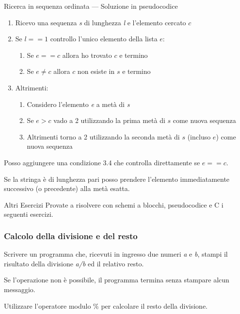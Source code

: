 \documentclass[aspectratio=169]{beamer}
\begin{document}
\begin{frame}[allowframebreaks]{Ricerca in sequenza ordinata --- Soluzione in pseudocodice}
\begin{enumerate}
	\item Ricevo una sequenza \emph{s} di lunghezza \emph{l} e l'elemento cercato $c$
	\item Se $l == 1$ controllo l'unico elemento della lista $e$:
	\begin{enumerate}
		\item Se $e==c$ allora ho trovato $c$ e termino
		\item Se $e\neq c$ allora $c$ non esiste in $s$ e termino
	\end{enumerate}
	\item Altrimenti:
	\begin{enumerate}
		\item Considero l'elemento \emph{e} a metà di \emph{s}
		\item Se $e > c$ vado a 2 utilizzando la prima metà di $s$ come nuova sequenza
		\item Altrimenti torno a 2 utilizzando la seconda metà di $s$ (incluso $e$) come nuova sequenza
	\end{enumerate}
\end{enumerate}

Posso aggiungere una condizione 3.4 che controlla direttamente se $e == c$.

Se la stringa è di lunghezza pari posso prendere l'elemento immediatamente successivo (o precedente) alla metà esatta.
\end{frame}





\appendix
\begin{frame}{Altri Esercizi}
    Provate a risolvere con schemi a blocchi, pseudocodice e C i seguenti esercizi.
\end{frame}

\begin{frame}
	\frametitle{Calcolo della divisione e del resto}
	Scrivere un programma che, ricevuti in ingresso due numeri \emph{a} e \emph{b}, stampi il risultato della divisione \emph{a/b} ed il relativo resto.

	Se l'operazione non è possibile, il programma termina senza stampare alcun messaggio.

	Utilizzare l'operatore modulo \% per calcolare il resto della divisione.
\end{frame}
\end{document}
